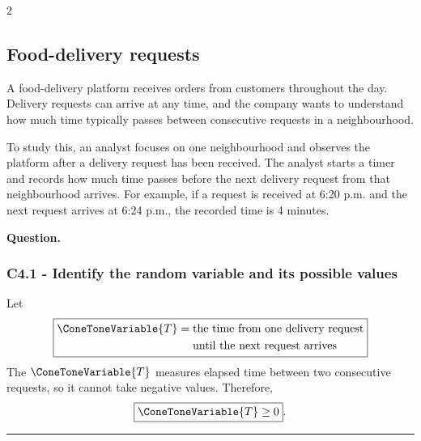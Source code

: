 \begin{multicols}{2}
	
\subsection{Food-delivery requests}\label{sec:c4-identify-delivery}
A food-delivery platform receives orders from customers throughout
the day. Delivery requests can arrive at any time, and the company wants to understand how much time typically passes between consecutive requests in a
neighbourhood.

To study this, an analyst focuses on one neighbourhood and observes the  platform after a delivery request has been received. The analyst starts a timer and records how much time passes before the next delivery request from
that neighbourhood arrives. For example, if a request is received at
6:20 p.m. and the next request arrives at 6:24 p.m., the recorded time is
4 minutes.



\textbf{Question.}
\begin{enumerate}
\end{enumerate}

\columnbreak

\subsubsection*{C4.1 - Identify the random variable and its possible values}\label{subsec:c4-identify-delivery-a}
Let
\[
\boxed{
	\begin{aligned}
		\ConeToneVariable{T}={}&\text{the time from one delivery request}\\
		&\text{until the next request arrives}
\end{aligned}}
\]
The   $\ConeToneVariable{T}$ measures elapsed time between two consecutive
requests, so it cannot take negative values. Therefore,
\[
\boxed{\ConeToneVariable{T}\geq0}.
\]
\end{multicols}

\noindent\rule{\textwidth}{0.4pt}


